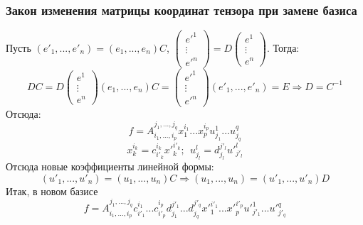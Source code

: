 \subsubsection*{Закон изменения матрицы координат тензора при замене базиса}
Пусть $(e'_1,...,e'_n) = (e_1,...,e_n)C$, $\begin{pmatrix} e'^1 \\ \vdots \\ e'^n \end{pmatrix} = D\begin{pmatrix} e^1 \\ \vdots \\ e^n \end{pmatrix}$. Тогда:
\[DC = D\begin{pmatrix} e^1 \\ \vdots \\ e^n \end{pmatrix}(e_1,...,e_n)C = \begin{pmatrix} e'^1 \\ \vdots \\ e'^n \end{pmatrix}(e'_1,...,e'_n) = E \Rightarrow D = C^{-1}\]
Отсюда:
\[f = A_{i_1,...,i_p}^{j_1,...,j_q}x_1^{i_1}...x_p^{i_p}u_{j_1}^1...u_{j_q}^q\]
\[x_k^{i_k} = c_{i'_k}^{i_k}{x'}^{i'_k}_k; \ \ u_{j_l}^{l} = d_{j_l}^{j'_l}u'^l_{j'_l}\]
Отсюда новые коэффициенты линейной формы:
\[(u'_1,...,u'_n) = (u_1,...,u_n)C \Longrightarrow (u_1,...,u_n) = (u'_1,...,u'_n)D\]
Итак, в новом базисе
\[f = A_{i_1,...,i_p}^{j_1,...,j_q} c_{i'_1}^{i_1}...c_{i'_p}^{i_p}d_{j_1}^{j'_1}...d_{j_q}^{j'_q}{x'}^{i'_1}_1...{x'}^{i'_p}_p {u'}^{1}_{j'_1}...{u'}^{q}_{j'_q}\]